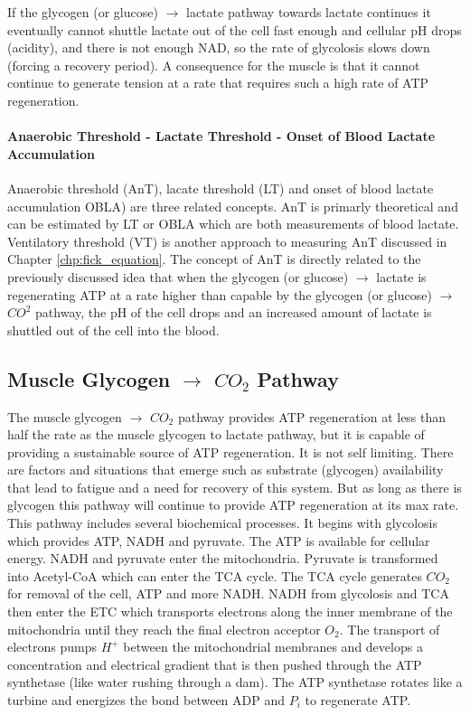 If the glycogen (or glucose) $\rightarrow$ lactate pathway towards lactate continues it eventually cannot shuttle lactate out of the cell fast enough and cellular pH drops (acidity), and there is not enough NAD, so the rate of glycolosis slows down (forcing a recovery period). A consequence for the muscle is that it cannot continue to generate tension at a rate that requires such a high rate of ATP regeneration.

\paragraph{Anaerobic Threshold - Lactate Threshold - Onset of Blood Lactate Accumulation}
Anaerobic threshold (AnT), lacate threshold (LT) and onset of blood lactate accumulation OBLA) are three related concepts. AnT is primarly theoretical and can be estimated by LT or OBLA which are both measurements of blood lactate. Ventilatory threshold (VT) is another approach to measuring AnT discussed in Chapter \ref{chp:fick_equation}. The concept of AnT is directly related to the previously discussed idea that when the glycogen (or glucose) $\rightarrow$ lactate is regenerating ATP at a rate higher than capable by the glycogen (or glucose) $\rightarrow$ $CO^2$ pathway, the pH of the cell drops and an increased amount of lactate is shuttled out of the cell into the blood.


\subsection{Muscle Glycogen $\rightarrow$ $CO_2$ Pathway}

The muscle glycogen $\rightarrow$ $CO_2$ pathway provides ATP regeneration at less than half the rate as the muscle glycogen to lactate pathway, but it is capable of providing a sustainable source of ATP regeneration. It is not self limiting. There are factors and situations that emerge such as substrate (glycogen) availability that lead to fatigue and a need for recovery of this system. But as long as there is glycogen this pathway will continue to provide ATP regeneration at its max rate. This pathway includes several biochemical processes. It begins with glycolosis which provides ATP, NADH and pyruvate. The ATP is available for cellular energy. NADH and pyruvate enter the mitochondria. Pyruvate is transformed into Acetyl-CoA which can enter the TCA cycle. The TCA cycle generates $CO_2$ for removal of the cell, ATP and more NADH. NADH from glycolosis and TCA then enter the ETC which transports electrons along the inner membrane of the mitochondria until they reach the final electron acceptor $O_2$. The transport of electrons pumps $H^+$ between the mitochondrial membranes and develops a concentration and electrical gradient  that is then pushed through the ATP synthetase (like water rushing through a dam). The ATP synthetase rotates like a turbine and energizes the bond between ADP and $P_i$ to regenerate ATP. 

